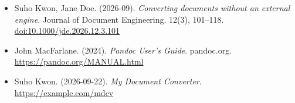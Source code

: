 \documentclass[11pt]{article}
\date{}
\begin{document}
\begin{itemize}
\item Suho Kwon, Jane Doe. (2026-09). \emph{Converting documents without an
external engine}. Journal of Document Engineering. 12(3), 101--118.
\href{https://doi.org/10.1000/jde.2026.12.3.101}{doi:10.1000/jde.2026.12.3.101}
\item John MacFarlane. (2024). \emph{Pandoc User's Guide}. pandoc.org.
\url{https://pandoc.org/MANUAL.html}
\item Suho Kwon. (2026-09-22). \emph{My Document Converter}.
\url{https://example.com/mdcv}
\end{itemize}
\end{document}
